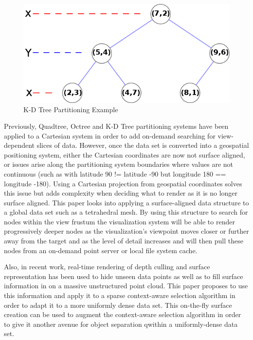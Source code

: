 \begin{figure}[htb]
\begin{center}
\includegraphics[width=.5\linewidth]{images/kdtree_layers.png}
\end{center}
\caption{K-D Tree Partitioning Example {\cite{13_tree_0001}}}
\label{fig:kdtreelayers}
\end{figure}

Previously, Quadtree, Octree \cite{3_wenzel2014out} and K-D Tree partitioning
systems have been applied to a Cartesian system in order to add on-demand
searching for view-dependent slices of data. However, once the data set is
converted into a geospatial positioning system, either the Cartesian coordinates
are now not surface aligned, or issues arise along the partitioning system
boundaries where values are not continuous (such as with latitude 90 != latitude
-90 but longitude 180 == longitude -180). Using a Cartesian projection from
geospatial coordinates solves this issue but adds complexity when deciding what
to render as it is no longer surface aligned. This paper looks into applying a
surface-aligned data structure to a global data set such as a tetrahedral mesh.
By using this structure to search for nodes within the view frustum the
visualization system will be able to render progressively deeper nodes as the
visualization's viewpoint moves closer or further away from the target and as
the level of detail increases and will then pull these nodes from an on-demand
point server or local file system cache.

Also, in recent work, real-time rendering of depth culling and surface
representation \cite{1_VAST:VAST11:105-112} has been used to hide unseen data
points as well as to fill surface information in on a massive unstructured point
cloud. This paper proposes to use this information and apply it to a sparse
context-aware selection algorithm \cite{2_yu:hal-01178051} in order to adapt it
to a more uniformly dense data set. This on-the-fly surface creation can be used
to augment the context-aware selection algorithm in order to give it another
avenue for object separation qwithin a uniformly-dense data set.
